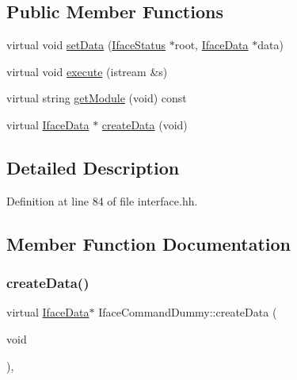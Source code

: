 \subsection*{Public Member Functions}
\begin{DoxyCompactItemize}
\item 
virtual void \mbox{\hyperlink{class_iface_command_dummy_a6cde79d0cd9edb822fa594259de68826}{set\+Data}} (\mbox{\hyperlink{class_iface_status}{Iface\+Status}} $\ast$root, \mbox{\hyperlink{class_iface_data}{Iface\+Data}} $\ast$data)
\item 
virtual void \mbox{\hyperlink{class_iface_command_dummy_acac62af3353e7afe18ca6fd05b0d75fa}{execute}} (istream \&s)
\item 
virtual string \mbox{\hyperlink{class_iface_command_dummy_ae7284da5e8726825621896c967b2d295}{get\+Module}} (void) const
\item 
virtual \mbox{\hyperlink{class_iface_data}{Iface\+Data}} $\ast$ \mbox{\hyperlink{class_iface_command_dummy_aa386a0965e95c4b2f6808a79cda853d6}{create\+Data}} (void)
\end{DoxyCompactItemize}


\subsection{Detailed Description}


Definition at line 84 of file interface.\+hh.



\subsection{Member Function Documentation}
\mbox{\label{class_iface_command_dummy_aa386a0965e95c4b2f6808a79cda853d6}} 
\subsubsection{\texorpdfstring{createData()}{createData()}}
{\footnotesize\ttfamily virtual \mbox{\hyperlink{class_iface_data}{Iface\+Data}}$\ast$ Iface\+Command\+Dummy\+::create\+Data (\begin{DoxyParamCaption}\item[{void}]{ }\end{DoxyParamCaption})\hspace{0.3cm}{\ttfamily [inline]}, {\ttfamily [virtual]}}



